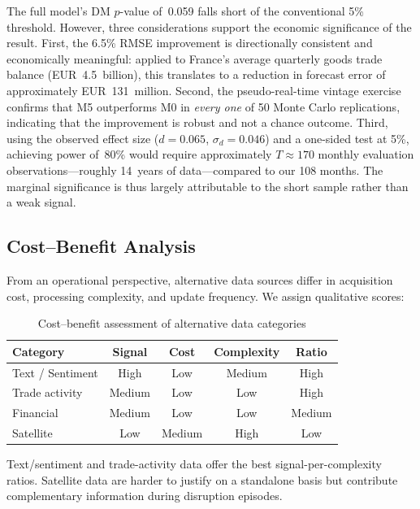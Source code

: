 The full model's DM $p$-value of~0.059 falls short of the conventional 5\% threshold.  However, three considerations support the economic significance of the result.  First, the 6.5\% RMSE improvement is directionally consistent and economically meaningful: applied to France's average quarterly goods trade balance (EUR~4.5~billion), this translates to a reduction in forecast error of approximately EUR~131~million.  Second, the pseudo-real-time vintage exercise confirms that M5 outperforms M0 in \emph{every one} of 50 Monte Carlo replications, indicating that the improvement is robust and not a chance outcome.  Third, using the observed effect size ($d = 0.065$, $\sigma_d = 0.046$) and a one-sided test at 5\%, achieving power of~80\% would require approximately $T \approx 170$ monthly evaluation observations---roughly 14~years of data---compared to our 108 months.  The marginal significance is thus largely attributable to the short sample rather than a weak signal.

\subsection{Cost--Benefit Analysis}

From an operational perspective, alternative data sources differ in acquisition cost, processing complexity, and update frequency.  We assign qualitative scores:

\begin{table}[htbp]
\centering
\caption{Cost--benefit assessment of alternative data categories}
\label{tab:ch2_costbenefit}
\begin{tabular}{@{} l c c c c @{}}
\toprule
{Category} & {Signal} & {Cost} & {Complexity} & {Ratio} \\
\midrule
Text / Sentiment  & High   & Low    & Medium & High  \\
Trade activity    & Medium & Low    & Low    & High  \\
Financial         & Medium & Low    & Low    & Medium \\
Satellite         & Low    & Medium & High   & Low   \\
\bottomrule
\end{tabular}
\end{table}

Text/sentiment and trade-activity data offer the best signal-per-complexity ratios.  Satellite data are harder to justify on a standalone basis but contribute complementary information during disruption episodes.



